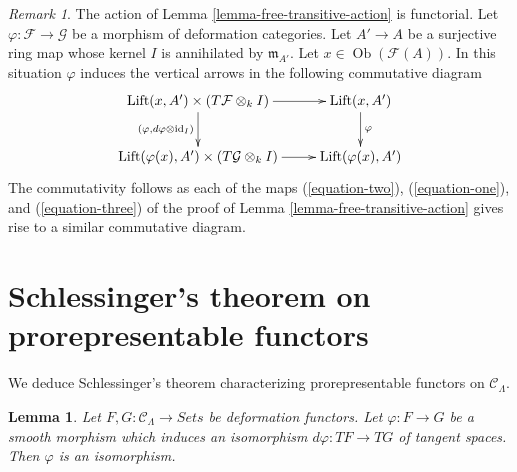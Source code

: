 \documentclass{stacks-project}
\theoremstyle{plain}
\newtheorem{lemma}[subsection]{Lemma}
\theoremstyle{definition}
\theoremstyle{remark}
\newtheorem{remark}[subsection]{Remark}
\numberwithin{equation}{subsection}
\def\Ob{\mathop{\mathrm{Ob}}\nolimits}
\begin{document}
\begin{remark}
\label{remark-free-transitive-action-functorial}
The action of Lemma \ref{lemma-free-transitive-action} is functorial.
Let $\varphi : \mathcal{F} \to \mathcal{G}$ be a morphism of deformation
categories. Let $A' \to A$ be a surjective ring map whose kernel $I$
is annihilated by $\mathfrak m_{A'}$. Let
$x \in \Ob(\mathcal{F}(A))$.
In this situation $\varphi$ induces the vertical arrows
in the following commutative diagram
$$
\xymatrix{
\text{Lift}(x, A') \times (T\mathcal{F} \otimes_k I)
\ar[d]_{(\varphi, d\varphi \otimes \text{id}_I)} \ar[r] &
\text{Lift}(x, A') \ar[d]^\varphi \\
\text{Lift}(\varphi(x), A') \times (T\mathcal{G} \otimes_k I) \ar[r] &
\text{Lift}(\varphi(x), A')
}
$$
The commutativity follows as each of the maps
(\ref{equation-two}), (\ref{equation-one}), and (\ref{equation-three})
of the proof of
Lemma \ref{lemma-free-transitive-action}
gives rise to a similar commutative diagram.
\end{remark}






\section{Schlessinger's theorem on prorepresentable functors}
\label{section-schlessingers-theorem}

\noindent
We deduce Schlessinger's theorem characterizing prorepresentable functors on
$\mathcal{C}_\Lambda$.

\begin{lemma}
\label{lemma-minimal-smooth-morphism-functors}
Let $F, G: \mathcal{C}_\Lambda \to \textit{Sets}$ be deformation
functors. Let $\varphi : F \to G$ be a smooth morphism which induces
an isomorphism $d\varphi : TF \to TG$ of tangent
spaces. Then $\varphi$ is an isomorphism.
\end{lemma}
\end{document}
